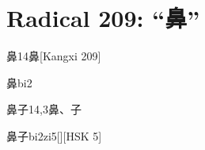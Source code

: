
\section*{Radical 209: ``⿐''}

\begin{Entry}{鼻}{14}{⿐}[Kangxi 209]
  \begin{Phonetics}{鼻}{bi2}
  \end{Phonetics}
\end{Entry}

\begin{Entry}{鼻子}{14,3}{⿐、⼦}
  \begin{Phonetics}{鼻子}{bi2zi5}[][HSK 5]
  \end{Phonetics}
\end{Entry}


